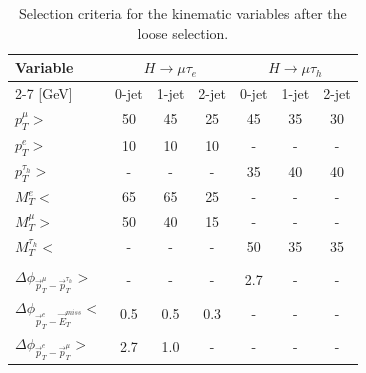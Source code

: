 \documentclass[oneside, letterpaper, oldfontcommands]{memoir}
\begin{document}
\begin{table}[hbtp]
 \centering
 \caption{Selection criteria for the kinematic variables after the loose selection.}
  \label{tab:kinematicselection}
   {\begin{tabular}{lccc|ccc} \hline
Variable & \multicolumn{3}{c|}{$H \rightarrow \mu \tau_{e}$} &      \multicolumn{3}{c}{$H \rightarrow \mu \tau_{h}$}  \\ \cline{2-7}
      [GeV]                                   &  0-jet        & 1-jet       & 2-jet         &  0-jet         & 1-jet       & 2-jet  \\ \hline
$p_{T}^{\mu}>$                                &     50        &   45        &   25          &  45            & 35          &  30    \\
$p_{T}^{e}>$                                  &     10        &   10        &   10          &   -            &  -          &  -      \\
$p_{T}^{\tau_{h}}>$                               &     -         &    -        &    -          &  35            & 40          &  40    \\
$M_{T}^{e}<$                                   &    65         &   65        &   25          &    -           &   -         &  -      \\
$M_{T}^{\mu}>$                                 &    50         &   40        &   15          &    -           &   -         &  -      \\
$M_{T}^{\tau_{h}}<$                                &     -         &    -        &    -          &  50            & 35          &   35   \\   \hline
      [radians]                               &                     &                \\  \hline
$\Delta\phi_{\vec{p}_{T}^{\mu}-\vec{p}_{T}^{\tau_{h}}}>$   &     -         &    -        &    -          &  2.7           &  -          &  -      \\
$\Delta\phi_{\vec{p}_{T}^{e}-\vec{E}_{T}^{miss}}<$             &    0.5        &   0.5       &   0.3         &    -           &  -          &  -      \\
$\Delta\phi_{\vec{p}_{T}^{e}-\vec{p}_{T}^{\mu}}>$            &    2.7        &   1.0       &    -          &    -           &   -         &  -      \\  \hline

  \end{tabular}
}
\end{table}
\end{document}
